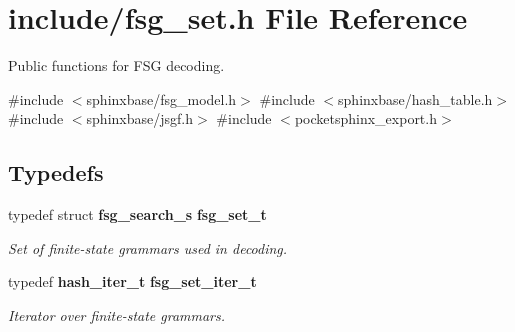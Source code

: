 \section{include/fsg\-\_\-set.h \-File \-Reference}
\label{fsg__set_8h}


\-Public functions for \-F\-S\-G decoding.  


{\ttfamily \#include $<$sphinxbase/fsg\-\_\-model.\-h$>$}\*
{\ttfamily \#include $<$sphinxbase/hash\-\_\-table.\-h$>$}\*
{\ttfamily \#include $<$sphinxbase/jsgf.\-h$>$}\*
{\ttfamily \#include $<$pocketsphinx\-\_\-export.\-h$>$}\*
\subsection*{\-Typedefs}
\begin{DoxyCompactItemize}
\item 
typedef struct {\bf fsg\-\_\-search\-\_\-s} {\bf fsg\-\_\-set\-\_\-t}\label{fsg__set_8h_a2af506620f0690db7ed8b09719532e4c}

\begin{DoxyCompactList}\small\item\em \-Set of finite-\/state grammars used in decoding. \end{DoxyCompactList}\item 
typedef {\bf hash\-\_\-iter\-\_\-t} {\bf fsg\-\_\-set\-\_\-iter\-\_\-t}\label{fsg__set_8h_abb8eed644c915f0599dc2cce38767b70}

\begin{DoxyCompactList}\small\item\em \-Iterator over finite-\/state grammars. \end{DoxyCompactList}\end{DoxyCompactItemize}

